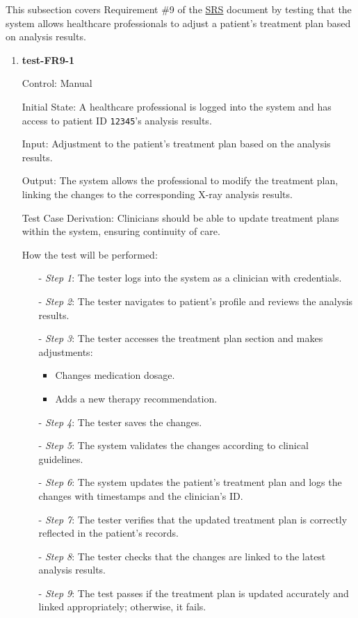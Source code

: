 \documentclass[12pt, titlepage]{article}
\begin{document}
This subsection covers Requirement \#9 of the \href{https://github.com/RezaJodeiri/CXR-Capstone/blob/main/docs/SRS/SRS.pdf}{SRS} \citep{SRS}
document by testing that the system allows healthcare professionals to adjust a patient's treatment plan based on analysis results.

\begin{enumerate}

\item \textbf{test-FR9-1} \label{test-FR9-1}

Control: Manual

Initial State: A healthcare professional is logged into the system and has access to patient ID \texttt{12345}'s analysis results.

Input: Adjustment to the patient's treatment plan based on the analysis results.

Output: The system allows the professional to modify the treatment plan, linking the changes to the corresponding X-ray analysis results.

Test Case Derivation: Clinicians should be able to update treatment plans within the system, ensuring continuity of care.

How the test will be performed:

\begin{itemize}
\item[-] \textit{Step 1}: The tester logs into the system as a clinician with credentials.
\item[-] \textit{Step 2}: The tester navigates to patient's profile and reviews the analysis results.
\item[-] \textit{Step 3}: The tester accesses the treatment plan section and makes adjustments:
  \begin{itemize}
    \item Changes medication dosage.
    \item Adds a new therapy recommendation.
  \end{itemize}
\item[-] \textit{Step 4}: The tester saves the changes.
\item[-] \textit{Step 5}: The system validates the changes according to clinical guidelines.
\item[-] \textit{Step 6}: The system updates the patient's treatment plan and logs the changes with timestamps and the clinician's ID.
\item[-] \textit{Step 7}: The tester verifies that the updated treatment plan is correctly reflected in the patient's records.
\item[-] \textit{Step 8}: The tester checks that the changes are linked to the latest analysis results.
\item[-] \textit{Step 9}: The test passes if the treatment plan is updated accurately and linked appropriately; otherwise, it fails.
\end{itemize}
\end{enumerate}
\end{document}
